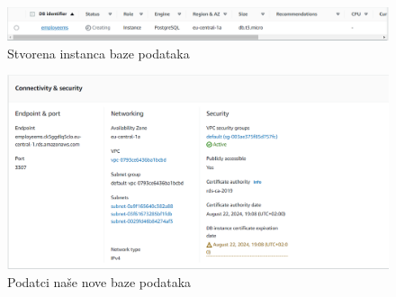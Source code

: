 			\begin{figure}[H]
				\includegraphics[scale=0.5]{slike/Deploy1.PNG} %
				\centering
				\caption{Stvorena instanca baze podataka}
				\label{fig:promjene}
			\end{figure}
			
				\begin{figure}[H]
				\includegraphics[scale=0.5]{slike/Deploy2.PNG} %
				\centering
				\caption{Podatci naše nove baze podataka}
				\label{fig:promjene}
			\end{figure}
			
			
			\eject 